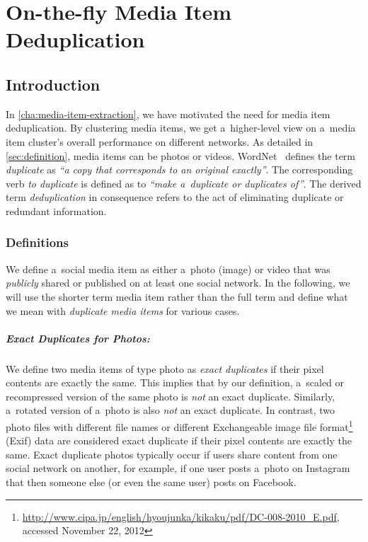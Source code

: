 \chapter{On-the-fly Media Item Deduplication}
\label{cha:media-item-deduplication}

\ifpdf
    \graphicspath{{7_media_item_deduplication/figures/PNG/}{7_media_item_deduplication/figures/PDF/}{7_media_item_deduplication/figures/}}
\else
    \graphicspath{{7_media_item_deduplication/figures/EPS/}{7_media_item_deduplication/figures/}}
\fi

\section{Introduction}

In \autoref{cha:media-item-extraction},
we have motivated the need for media item deduplication.
By clustering media items, we get a~higher-level view on
a~media item cluster's overall performance on different networks.
As detailed in \autoref{sec:definition}, media items can be
photos or videos.
WordNet~\cite{fellbaum1998wordnet,miller1995wordnet} defines
the term \emph{duplicate} as
\textit{``a copy that corresponds to an original exactly''}.
The corresponding verb \emph{to duplicate} is defined as to
\textit{``make a~duplicate or duplicates of''}.
The derived term \emph{deduplication} in consequence refers to
the act of eliminating duplicate or redundant information.

\subsection{Definitions}

We define a~social media item as either a~photo (image) or video
that was \emph{publicly} shared or published
on at least one social network.
In the following, we will use the shorter term media item
rather than the full term and define
what we mean with \emph{duplicate media items} for various cases.

\paragraph{Exact Duplicates for Photos:}

We define two media items of type photo as \emph{exact duplicates}
if their pixel contents are exactly the same.
This implies that by our definition, a~scaled or recompressed version
of the same photo is \emph{not} an exact duplicate. 
Similarly, a~rotated version of a~photo is also \emph{not}
an exact duplicate. 
In contrast, two photo files with different file names
or different Exchangeable image file
format\footnote{\url{http://www.cipa.jp/english/hyoujunka/kikaku/pdf/DC-008-2010_E.pdf},
accessed November 22, 2012}
(Exif) data are considered exact duplicate
if their pixel contents are exactly the same.
Exact duplicate photos typically occur if users share content 
from one social network on another, for example,
if one user posts a~photo on Instagram that then someone else
(or even the same user) posts on Facebook.

